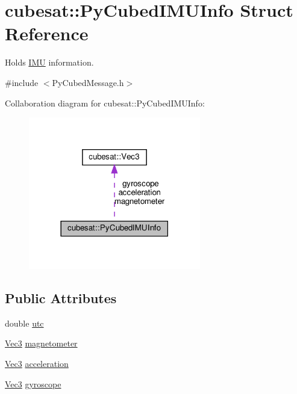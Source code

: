 \hypertarget{structcubesat_1_1PyCubedIMUInfo}{}\section{cubesat\+:\+:Py\+Cubed\+I\+M\+U\+Info Struct Reference}
\label{structcubesat_1_1PyCubedIMUInfo}


Holds \hyperlink{classcubesat_1_1IMU}{I\+MU} information.  




{\ttfamily \#include $<$Py\+Cubed\+Message.\+h$>$}



Collaboration diagram for cubesat\+:\+:Py\+Cubed\+I\+M\+U\+Info\+:
\nopagebreak
\begin{figure}[H]
\begin{center}
\leavevmode
\includegraphics[width=213pt]{structcubesat_1_1PyCubedIMUInfo__coll__graph}
\end{center}
\end{figure}
\subsection*{Public Attributes}
\begin{DoxyCompactItemize}
\item 
double \hyperlink{structcubesat_1_1PyCubedIMUInfo_a3785744217caa5acc457d3f92cd07c7c}{utc}
\item 
\hyperlink{structcubesat_1_1Vec3}{Vec3} \hyperlink{structcubesat_1_1PyCubedIMUInfo_ad0340495c1ab66bb9060444541b33256}{magnetometer}
\item 
\hyperlink{structcubesat_1_1Vec3}{Vec3} \hyperlink{structcubesat_1_1PyCubedIMUInfo_a3b31df3109a4212dde3971da625dcb26}{acceleration}
\item 
\hyperlink{structcubesat_1_1Vec3}{Vec3} \hyperlink{structcubesat_1_1PyCubedIMUInfo_af053687ac00c0d374c092e9f39634756}{gyroscope}
\end{DoxyCompactItemize}


